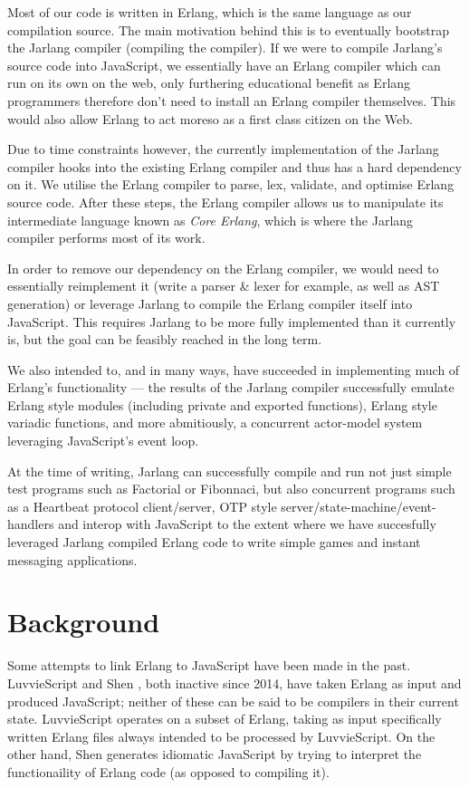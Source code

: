 \documentclass[twoside,12pt,titlepage,a4paper]{article}
\begin{document}
Most of our code is written in Erlang, which is the same language as our compilation source. The main motivation behind this is to eventually bootstrap the Jarlang compiler (compiling the compiler). If we were to compile Jarlang's source code into JavaScript, we essentially have an Erlang compiler which can run on its own on the web, only furthering educational benefit as Erlang programmers therefore don't need to install an Erlang compiler themselves. This would also allow Erlang to act moreso as a first class citizen on the Web.

Due to time constraints however, the currently implementation of the Jarlang compiler hooks into the existing Erlang compiler and thus has a hard dependency on it. We utilise the Erlang compiler to parse, lex, validate, and optimise Erlang source code. After these steps, the Erlang compiler allows us to manipulate its intermediate language known as \textit{Core Erlang}, which is where the Jarlang compiler performs most of its work.

In order to remove our dependency on the Erlang compiler, we would need to essentially reimplement it (write a parser \& lexer for example, as well as AST generation) or leverage Jarlang to compile the Erlang compiler itself into JavaScript. This requires Jarlang to be more fully implemented than it currently is, but the goal can be feasibly reached in the long term.

We also intended to, and in many ways, have succeeded in implementing much of Erlang's functionality --- the results of the Jarlang compiler successfully emulate Erlang style modules (including private and exported functions), Erlang style variadic functions, and more abmitiously, a concurrent actor-model system leveraging JavaScript's event loop.

At the time of writing, Jarlang can successfully compile and run not just simple test programs such as Factorial or Fibonnaci, but also concurrent programs such as a Heartbeat protocol client/server, OTP style server/state-machine/event-handlers and interop with JavaScript to the extent where we have succesfully leveraged Jarlang compiled Erlang code to write simple games and instant messaging applications.

\section{Background}
\label{Background}

Some attempts to link Erlang to JavaScript have been made in the past. LuvvieScript \citep{luvvieGitHub} and Shen \citep{ShenGitHub}, both inactive since 2014, have taken Erlang as input and produced JavaScript; neither of these can be said to be compilers in their current state. LuvvieScript operates on a subset of Erlang, taking as input specifically written Erlang files always intended to be processed by LuvvieScript. On the other hand, Shen generates idiomatic JavaScript by trying to interpret the functionaility of Erlang code (as opposed to compiling it).
\end{document}
